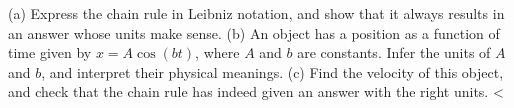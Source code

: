 (a) Express the chain rule in Leibniz notation, and show that it always results in an answer whose
units make sense.\hwendpart
(b) An object has a  position as a function of time
given by $x=A\cos(bt)$, where $A$ and $b$ are constants.
Infer the units of $A$ and $b$, and interpret their physical meanings.\hwendpart
(c) Find the velocity of this object, and check that the chain rule has indeed given an answer with
the right units.\hwendpart
<%

